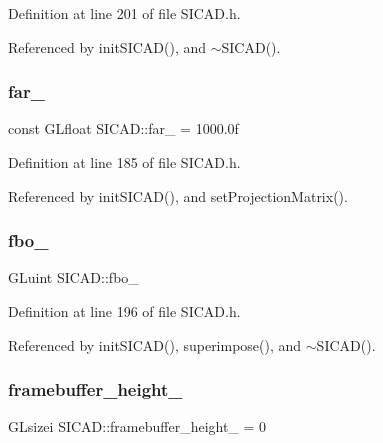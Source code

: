 Definition at line 201 of file S\+I\+C\+A\+D.\+h.



Referenced by init\+S\+I\+C\+A\+D(), and $\sim$\+S\+I\+C\+A\+D().

\mbox{\label{classSICAD_a4c4d2e249ac824528e1fe9f97fa207d9}} 
\subsubsection{\texorpdfstring{far\+\_\+}{far\_}}
{\footnotesize\ttfamily const G\+Lfloat S\+I\+C\+A\+D\+::far\+\_\+ = 1000.\+0f\hspace{0.3cm}{\ttfamily [private]}}



Definition at line 185 of file S\+I\+C\+A\+D.\+h.



Referenced by init\+S\+I\+C\+A\+D(), and set\+Projection\+Matrix().

\mbox{\label{classSICAD_a2c173ad18d42e090b46a539f92f3fe9d}} 
\subsubsection{\texorpdfstring{fbo\+\_\+}{fbo\_}}
{\footnotesize\ttfamily G\+Luint S\+I\+C\+A\+D\+::fbo\+\_\+\hspace{0.3cm}{\ttfamily [private]}}



Definition at line 196 of file S\+I\+C\+A\+D.\+h.



Referenced by init\+S\+I\+C\+A\+D(), superimpose(), and $\sim$\+S\+I\+C\+A\+D().

\mbox{\label{classSICAD_a3361bb03e52bc0554bb1e3670ef3a0f9}} 
\subsubsection{\texorpdfstring{framebuffer\+\_\+height\+\_\+}{framebuffer\_height\_}}
{\footnotesize\ttfamily G\+Lsizei S\+I\+C\+A\+D\+::framebuffer\+\_\+height\+\_\+ = 0\hspace{0.3cm}{\ttfamily [private]}}



